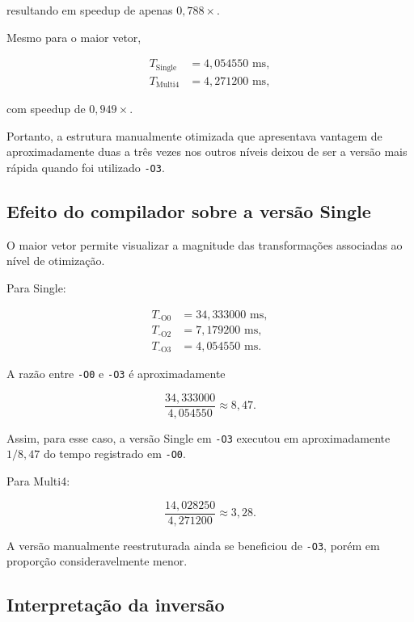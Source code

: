 resultando em speedup de apenas \(0{,}788\times\).

Mesmo para o maior vetor,

\begin{align}
T_{\text{Single}} &= 4{,}054550\text{ ms},\\
T_{\text{Multi4}} &= 4{,}271200\text{ ms},
\end{align}

com speedup de \(0{,}949\times\).

Portanto, a estrutura manualmente otimizada que apresentava vantagem de aproximadamente
duas a três vezes nos outros níveis deixou de ser a versão mais rápida quando foi utilizado
\texttt{-O3}.


\subsection{Efeito do compilador sobre a versão Single}

O maior vetor permite visualizar a magnitude das transformações associadas ao nível de
otimização.

Para Single:

\begin{align}
T_{\text{-O0}} &= 34{,}333000\text{ ms},\\
T_{\text{-O2}} &= 7{,}179200\text{ ms},\\
T_{\text{-O3}} &= 4{,}054550\text{ ms}.
\end{align}

A razão entre \texttt{-O0} e \texttt{-O3} é aproximadamente

\begin{equation}
\frac{34{,}333000}{4{,}054550}
\approx
8{,}47.
\end{equation}

Assim, para esse caso, a versão Single em \texttt{-O3} executou em aproximadamente
\(1/8{,}47\) do tempo registrado em \texttt{-O0}.

Para Multi4:

\begin{equation}
\frac{14{,}028250}{4{,}271200}
\approx
3{,}28.
\end{equation}

A versão manualmente reestruturada ainda se beneficiou de \texttt{-O3}, porém em proporção
consideravelmente menor.


\subsection{Interpretação da inversão}

